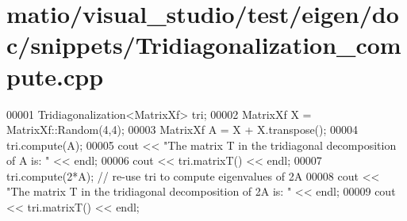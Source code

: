 \hypertarget{matio_2visual__studio_2test_2eigen_2doc_2snippets_2_tridiagonalization__compute_8cpp_source}{}\section{matio/visual\+\_\+studio/test/eigen/doc/snippets/\+Tridiagonalization\+\_\+compute.cpp}
\label{matio_2visual__studio_2test_2eigen_2doc_2snippets_2_tridiagonalization__compute_8cpp_source}

\begin{DoxyCode}
00001 Tridiagonalization<MatrixXf> tri;
00002 MatrixXf X = MatrixXf::Random(4,4);
00003 MatrixXf A = X + X.transpose();
00004 tri.compute(A);
00005 cout << \textcolor{stringliteral}{"The matrix T in the tridiagonal decomposition of A is: "} << endl;
00006 cout << tri.matrixT() << endl;
00007 tri.compute(2*A); \textcolor{comment}{// re-use tri to compute eigenvalues of 2A}
00008 cout << \textcolor{stringliteral}{"The matrix T in the tridiagonal decomposition of 2A is: "} << endl;
00009 cout << tri.matrixT() << endl;
\end{DoxyCode}
